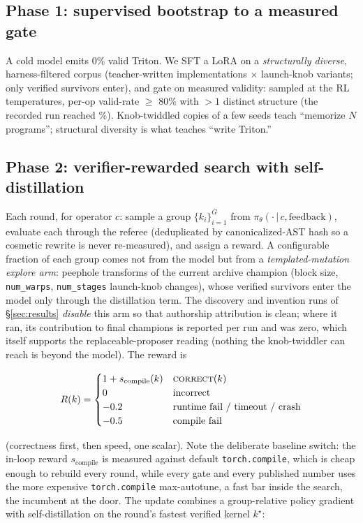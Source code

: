 \documentclass[10pt]{article}
\newcommand{\maxauto}{\texttt{torch.compile} max-autotune}
\begin{document}
\subsection{Phase 1: supervised bootstrap to a measured gate}
A cold model emits 0\% valid Triton. We SFT a LoRA on a \emph{structurally diverse},
harness-filtered corpus (teacher-written implementations $\times$ launch-knob variants;
only verified survivors enter), and gate on measured validity: sampled at the RL
temperatures, per-op valid-rate $\ge$ 80\% with $>1$ distinct structure (the recorded run
reached \sftBestValid\%). Knob-twiddled copies of a few seeds teach ``memorize $N$
programs''; structural diversity is what teaches ``write Triton.''

\subsection{Phase 2: verifier-rewarded search with self-distillation}
Each round, for operator $c$: sample a group $\{k_i\}_{i=1}^{G}$ from
$\pi_\theta(\cdot\,|\,c,\text{feedback})$, evaluate each through the referee (deduplicated
by canonicalized-AST hash so a cosmetic rewrite is never re-measured), and assign a reward.
A configurable fraction of each group comes not from the model but from a
\emph{templated-mutation explore arm}: peephole transforms of the current archive champion
(block size, \texttt{num\_warps}, \texttt{num\_stages} launch-knob changes), whose verified
survivors enter the model only through the distillation term. The discovery and invention
runs of \S\ref{sec:results} \emph{disable} this arm so that authorship attribution is
clean; where it ran, its contribution to final champions is reported per run and was zero,
which itself supports the replaceable-proposer reading (nothing the knob-twiddler can reach
is beyond the model). The reward is

\begin{equation}\label{eq:reward}
R(k) =
\begin{cases}
1 + s_{\mathrm{compile}}(k) & \textsc{correct}(k)\\
0 & \text{incorrect}\\
-0.2 & \text{runtime fail / timeout / crash}\\
-0.5 & \text{compile fail}
\end{cases}
\end{equation}

\noindent (correctness first, then speed, one scalar). Note the deliberate baseline switch:
the in-loop reward $s_{\mathrm{compile}}$ is measured against default
\texttt{torch.compile}, which is cheap enough to rebuild every round, while every gate and
every published number uses the more expensive \maxauto{}, a fast bar inside the search,
the incumbent at the door. The update combines a
group-relative policy gradient \cite{deepseekmath} with self-distillation on the round's
fastest verified kernel $k^\star$:
\end{document}
